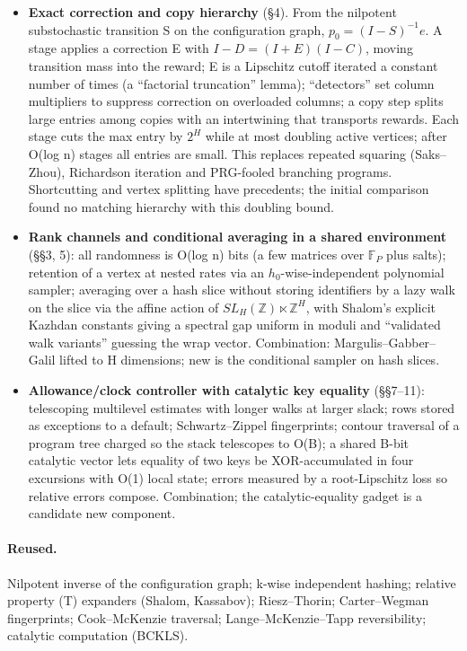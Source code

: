 \documentclass[11pt]{article}
\begin{document}
\begin{itemize}
\item \textbf{Exact correction and copy hierarchy} (\S{}4). From the nilpotent substochastic transition S on the configuration graph, $p_0=(I-S)^{-1}e$. A stage applies a correction E with $I-D=(I+E)(I-C)$, moving transition mass into the reward; E is a Lipschitz cutoff iterated a constant number of times (a ``factorial truncation'' lemma); ``detectors'' set column multipliers to suppress correction on overloaded columns; a copy step splits large entries among copies with an intertwining that transports rewards. Each stage cuts the max entry by $2^H$ while at most doubling active vertices; after O(log n) stages all entries are small. This replaces repeated squaring (Saks--Zhou), Richardson iteration and PRG-fooled branching programs. Shortcutting and vertex splitting have precedents; the initial comparison found no matching hierarchy with this doubling bound.
\item \textbf{Rank channels and conditional averaging in a shared environment} (\S{}\S{}3, 5): all randomness is O(log n) bits (a few matrices over $\mathbb F_P$ plus salts); retention of a vertex at nested rates via an $h_{0}$-wise-independent polynomial sampler; averaging over a hash slice without storing identifiers by a lazy walk on the slice via the affine action of $SL_H(\mathbb Z)\ltimes\mathbb Z^H$, with Shalom's explicit Kazhdan constants giving a spectral gap uniform in moduli and ``validated walk variants'' guessing the wrap vector. Combination: Margulis--Gabber--Galil lifted to H dimensions; new is the conditional sampler on hash slices.
\item \textbf{Allowance/clock controller with catalytic key equality} (\S{}\S{}7--11): telescoping multilevel estimates with longer walks at larger slack; rows stored as exceptions to a default; Schwartz--Zippel fingerprints; contour traversal of a program tree charged so the stack telescopes to O(B); a shared B-bit catalytic vector lets equality of two keys be XOR-accumulated in four excursions with O(1) local state; errors measured by a root-Lipschitz loss so relative errors compose. Combination; the catalytic-equality gadget is a candidate new component.
\end{itemize}

\paragraph{Reused.}

Nilpotent inverse of the configuration graph; k-wise independent hashing; relative property (T) expanders (Shalom, Kassabov); Riesz--Thorin; Carter--Wegman fingerprints; Cook--McKenzie traversal; Lange--McKenzie--Tapp reversibility; catalytic computation (BCKLS).
\end{document}
